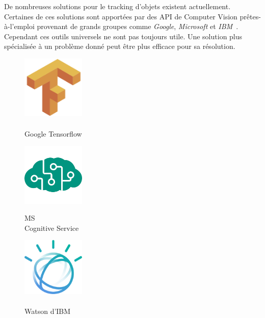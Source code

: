     
       De nombreuses solutions pour le tracking d'objets existent actuellement. Certaines de ces solutions sont apportées par des API de Computer Vision prêtes-à-l'emploi provenant de grands groupes comme \textit{Google}, \textit{Microsoft} et \textit{IBM}~\cite{trackingSotA2}. Cependant ces outils universels ne sont pas toujours utile. Une solution plus spécialisée à un problème donné peut être plus efficace pour sa résolution.
       

\begin{minipage}{0.3265\textwidth}
\begin{figure}[H]
  \centering
  \includegraphics[width=3cm]{img/tensorflow.png}
    \caption{\\Google Tensorflow}
\end{figure}
\end{minipage}
\begin{minipage}{0.34\textwidth}
\begin{figure}[H]
  \centering
  \includegraphics[width=3cm]{img/MicrosoftCS.png}
    \label{MS Cognitive Service}
    \caption{MS\\Cognitive Service}
\end{figure}
\end{minipage}
\begin{minipage}{0.3265\textwidth}
\begin{figure}[H]
  \centering
  \includegraphics[width=3cm]{img/IBM_Watson_Logo_2017.png}
    \caption{\\Watson d'IBM}
\end{figure}
\end{minipage}

